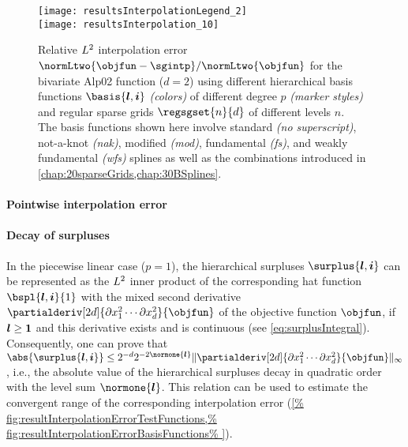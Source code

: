 \begin{SCfigure}
  \begin{minipage}{102mm}%
    \hspace*{10mm}%
    \texttt{[image: resultsInterpolationLegend\_2]}\\[2mm]%
    \texttt{[image: resultsInterpolation\_10]}%
  \end{minipage}%
  \caption[Relative interpolation errors for different basis functions]{%
    Relative $L^2$ interpolation error
    $\normLtwo{\objfun - \sgintp}/\normLtwo{\objfun}$
    for the bivariate Alp02 function ($d = 2$)
    using different hierarchical basis functions
    $\basis{\*l,\*i}$ \emph{(colors)}
    of different degree $p$ \emph{(marker styles)} and
    regular sparse grids $\regsgset{n}{d}$ of different levels $n$.\\
    The basis functions shown here involve
    standard \emph{(no superscript)},
    not-a-knot \emph{(nak)},
    modified \emph{(mod)},
    fundamental \emph{(fs)}, and
    weakly fundamental \emph{(wfs)}
    splines as well as the combinations
    introduced in \cref{chap:20sparseGrids,chap:30BSplines}.%
  }%
  \label{fig:resultInterpolationErrorBasisFunctions}%
\end{SCfigure}

\paragraph{Pointwise interpolation error}

\blindtext{}

\paragraph{Decay of surpluses}

In the piecewise linear case ($p = 1$),
the hierarchical surpluses $\surplus{\*l,\*i}$
can be represented as the $L^2$ inner product of
the corresponding hat function $\bspl{\*l,\*i}{1}$ with the
mixed second derivative
$\partialderiv[2d]{\partialdiff x_1^2 \dotsm \partialdiff x_d^2}{\objfun}$
of the objective function $\objfun$,
if ${\boldsymbol{l}} \ge {\boldsymbol{1}}$ and this derivative exists and is continuous
(see \cref{eq:surplusIntegral}).
Consequently, one can prove that
$\abs{\surplus{\*l,\*i}} \le 2^{-d} 2^{-2\normone{\*l}}
\norm[\infty]{
  \partialderiv[2d]{\partialdiff x_1^2 \dotsm \partialdiff x_d^2}{\objfun}
}$ \cite{Bungartz04Sparse},
i.e., the absolute value of the hierarchical surpluses
decay in quadratic order with the level sum $\normone{\*l}$.
This relation can be used to estimate the convergent range
of the corresponding interpolation error (\cref{%
  fig:resultInterpolationErrorTestFunctions,%
  fig:resultInterpolationErrorBasisFunctions%
}).

